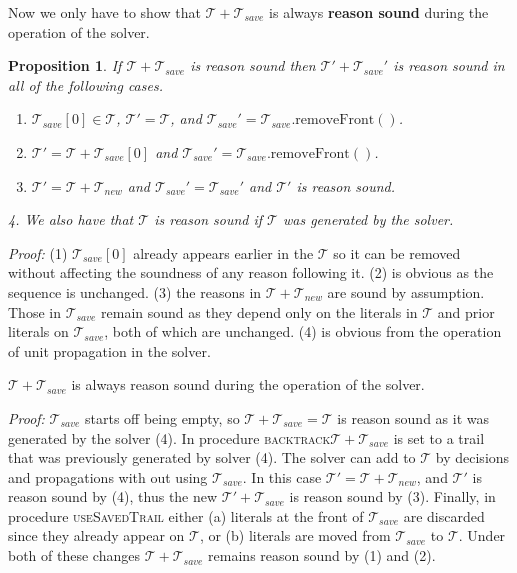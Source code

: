 \documentclass[runningheads]{llncs}
\newcommand{\trail}{\ensuremath{\mathcal{T}}}
\newcommand{\trailsave}{\trail_{\mathit{save}}}
\newcommand{\bt}{\textsc{backtrack}\xspace}
\newcommand{\ust}{\textsc{useSavedTrail}\xspace}
\newtheorem{prop}{Proposition}
\newcommand{\whitebox}{\raisebox{.5ex}{\fbox{\hspace*{.2ex}}}}
\begin{document}
Now we only have to show that $\trail+\trailsave$ is always
\textbf{reason sound} during the operation of the solver.
\begin{prop}
    \label{prop:sound}
    If $\trail+\trailsave$ is reason sound then $\trail'+\trailsave'$
    is reason sound in all of the following cases.
    \begin{enumerate}
    \item $\trailsave[0]\in \trail$, $\trail'=\trail$, and
        $\trailsave' = \trailsave.\mathrm{removeFront()}$.
    \item $\trail' = \trail+\trailsave[0]$ and
        $\trailsave' = \trailsave.\mathrm{removeFront()}$.
    \item $\trail' = \trail + \trail_{\mathit{new}}$ and
        $\trailsave' = \trailsave'$ and $\trail'$ is reason sound.
    \end{enumerate}
    4. We also have that $\trail$ is reason sound if $\trail$ was
    generated by the solver.
\end{prop}
\noindent \emph{Proof:} (1) $\trailsave[0]$ already appears earlier in
the $\trail$ so it can be removed without affecting the soundness of
any reason following it. (2) is obvious as the sequence is
unchanged. (3) the reasons in $\trail+\trail_{\mathit{new}}$ are sound
by assumption. Those in $\trailsave$ remain sound as they depend only
on the literals in $\trail$ and prior literals on $\trailsave$, both
of which are unchanged. (4) is obvious from the operation of unit
propagation in the solver.  \whitebox

\begin{theorem}
    \label{thm:rsound}
    $\trail+\trailsave$ is always reason sound during the operation of
    the solver.
\end{theorem}
\noindent \emph{Proof:} $\trailsave$ starts off being empty, so
$\trail+\trailsave = \trail$ is reason sound as it was generated by
the solver (4). In procedure \bt $\trail+\trailsave$ is
set to a trail that was previously generated by solver (4). The solver
can add to $\trail$ by decisions and propagations with out using
$\trailsave$. In this case $\trail' = \trail+\trail_{\mathit{new}}$,
and $\trail'$ is reason sound by (4), thus the new
$\trail'+\trailsave$ is reason sound by (3). Finally, in procedure
\ust either (a) literals at the front of
$\trailsave$ are discarded since they already appear on $\trail$, or
(b) literals are moved from $\trailsave$ to $\trail$. Under both of
these changes $\trail+\trailsave$ remains reason sound by (1) and (2).
\whitebox
\end{document}
